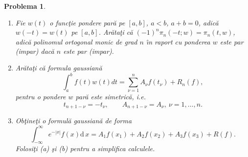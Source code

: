 \documentclass[12pt]{article}%
\newtheorem{problem}[theorem]{Problema}
\begin{document}
\begin{problem}
\label{pb4.37}

\begin{enumerate}
\item[(a)] Fie $w(t)$ o func\c{t}ie pondere par\u{a} pe $[a,b]$, $a<b$,
$a+b=0$, adic\u{a} $w(-t)=w(t)$ pe $[a,b]$. Ar\u{a}ta\c{t}i c\u{a}
$(-1)^{n}\pi_{n}(-t;w)=\pi_{n}(t,w)$, adic\u{a} polinomul ortogonal monic de
grad $n$ \^{\i}n raport cu ponderea $w$ este par (impar) dac\u{a} $n$ este par (impar).

\item[(b)] Ar\u{a}ta\c{t}i c\u{a} formula gaussian\u{a}
\[
\int_{a}^{b}f(t)w(t)dt=\sum_{\nu=1}^{n}A_{\nu}f(t_{\nu})+R_{n}(f),
\]
pentru o pondere $w$ par\u{a} este simetric\u{a}, i.e.
\[
t_{n+1-\nu}=-t_{\nu},\qquad A_{n+1-\nu}=A_{\nu},~\nu=1,\dots,n.
\]


\item[(c)] Ob\c{t}ine\c{t}i o formul\u{a} gaussian\u{a} de forma%
\[
\int_{-\infty}^{\infty}e^{-|x|}f(x)\mathrm{d}\,x=A_{1}f(x_{1})+A_{2}%
f(x_{2})+A_{3}f(x_{3})+R(f).
\]
Folosi\c{t}i (a) \c{s}i (b) pentru a simplifica calculele.
\end{enumerate}
\end{problem}
\end{document}
